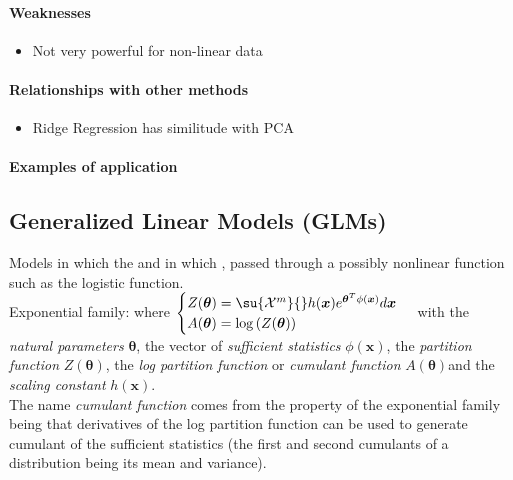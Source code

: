 \paragraph{Weaknesses}
\begin{itemize}
    \item Not very powerful for non-linear data

\end{itemize}

\paragraph{Relationships with other methods}
\begin{itemize}
    \item Ridge Regression has similitude with PCA
\end{itemize}

\paragraph{Examples of application}


\subsection{Generalized Linear Models (GLMs)}
Models in which the  and in which , passed through a possibly nonlinear
function such as the logistic function.\\
Exponential family:
where
$\begin{cases}
    Z(\bm{\theta}) = \su{\mathcal{X}^{m}}{}h(\bm{x})e^{\bm{\theta}^{T}\phi(\bm{x})}
    d\bm{x} \\
    A(\bm{\theta}) = \log\left(Z(\bm{\theta})\right)
\end{cases}$
with the \emph{natural parameters} $\bm{\theta}$, the vector of  \emph{sufficient 
statistics} $\phi(\bm{x})$, the \emph{partition function} $Z(\bm{\theta})$, the 
\emph{log partition function} or \emph{cumulant function} $A(\bm{\theta})$and the 
\emph{scaling constant} $h(\bm{x})$.\\
The name \emph{cumulant function} comes from the property of the exponential family 
being that derivatives of the log partition function can be used to generate cumulant
of the sufficient statistics (the first and second cumulants of a distribution being
its mean and variance).
